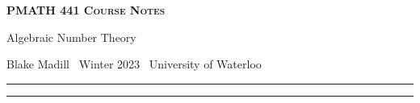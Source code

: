 \documentclass[10pt]{article}
\numberwithin{equation}{section}
\newcommand{\newtitle}[4]{
  \begin{center}
	\huge{\textbf{\textsc{#1 Course Notes}}}
    
	\large{\sc #2}
    
	{\sc #3 \textbullet\, #4 \textbullet\, University of Waterloo}
	\normalsize\vspace{1cm}\hrule
  \end{center}
}
\begin{document}
\pagestyle{fancy}
\newtitle{PMATH 441}{Algebraic Number Theory}{Blake Madill}{Winter 2023}

\tableofcontents
\vspace{1cm}\hrule
\fancyhead[R]{\nouppercase\rightmark}
\newpage 
{}

\newpage
\newpage
\newpage
\end{document}
